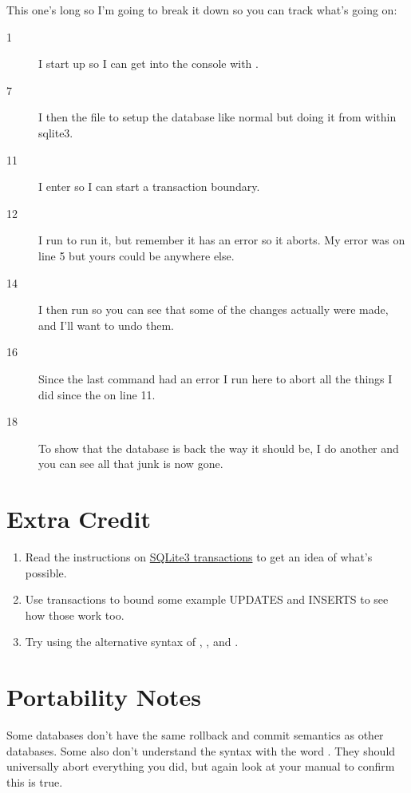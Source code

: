 This one's long so I'm going to break it down so you can track what's going on:

\begin{description}
\item[1] I start up  so I can get into the console with .
\item[7] I then  the  file to setup the database like 
    normal but doing it from within sqlite3.
\item[11] I enter  so I can start a transaction boundary.
\item[12] I run  to run it, but remember it has an error
    so it aborts.  My error was on line 5 but yours could be anywhere else.
\item[14] I then run  so you can see that some of the changes
    actually were made, and I'll want to undo them.
\item[16] Since the last command had an error I run  here to 
    abort all the things I did since the  on line 11.
\item[18] To show that the database is back the way it should be, I do another
     and you can see all that junk is now gone.
\end{description}
    

\section{Extra Credit}

\begin{enumerate}
\item Read the instructions on \href{http://www.sqlite.org/lang_transaction.html}{SQLite3 transactions} to get an idea of what's possible.
\item Use transactions to bound some example UPDATES and INSERTS to see how those
    work too.
\item Try using the alternative syntax of , , and .
\end{enumerate}

\section{Portability Notes}

Some databases don't have the same rollback and commit semantics as other databases.
Some also don't understand the syntax with the word .  They should
universally abort everything you did, but again look at your manual to confirm
this is true.


